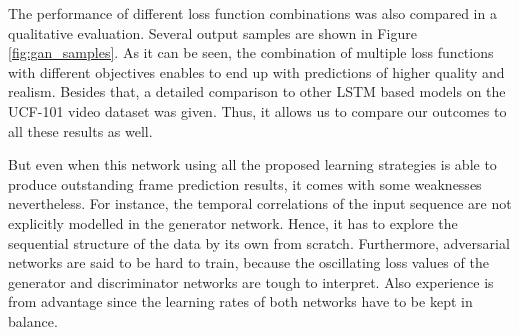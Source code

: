 The performance of different loss function combinations was also compared in a qualitative evaluation. Several output samples are shown in Figure \ref{fig:gan_samples}. As it can be seen, the combination of multiple loss functions with different objectives enables to end up with predictions of higher quality and realism. Besides that, a detailed comparison to other LSTM based models on the UCF-101 video dataset was given. Thus, it allows us to compare our outcomes to all these results as well.

But even when this network using all the proposed learning strategies is able to produce outstanding frame prediction results, it comes with some weaknesses nevertheless. For instance, the temporal correlations of the input sequence are not explicitly modelled in the generator network. Hence, it has to explore the sequential structure of the data by its own from scratch. Furthermore, adversarial networks are said to be hard to train, because the oscillating loss values of the generator and discriminator networks are tough to interpret. Also experience is from advantage since the learning rates of both networks have to be kept in balance.
